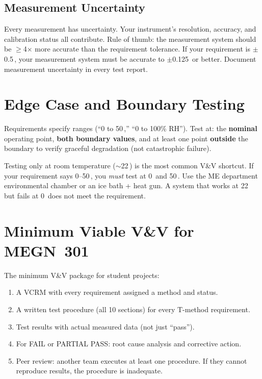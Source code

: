 \subsection{Measurement Uncertainty}
Every measurement has uncertainty. Your instrument's resolution, accuracy, and calibration status all contribute. Rule of thumb: the measurement system should be $\geq$4$\times$ more accurate than the requirement tolerance. If your requirement is $\pm$0.5\,\degC{}, your measurement system must be accurate to $\pm$0.125\,\degC{} or better. Document measurement uncertainty in every test report.

\section{Edge Case and Boundary Testing}
Requirements specify ranges (``0 to 50\,\degC{},'' ``0 to 100\% RH''). Test at: the \textbf{nominal} operating point, \textbf{both boundary values}, and at least one point \textbf{outside} the boundary to verify graceful degradation (not catastrophic failure).

\begin{tipbox}
Testing only at room temperature ($\sim$22\,\degC{}) is the most common V\&V shortcut. If your requirement says 0--50\,\degC{}, you \emph{must} test at 0\,\degC{} and 50\,\degC{}. Use the ME department environmental chamber or an ice bath + heat gun. A system that works at 22\,\degC{} but fails at 0\,\degC{} does not meet the requirement.
\end{tipbox}

\section{Minimum Viable V\&V for MEGN~301}
The minimum V\&V package for student projects:
\begin{enumerate}[nosep,leftmargin=1.5em]
\item A VCRM with every requirement assigned a method and status.
\item A written test procedure (all 10 sections) for every T-method requirement.
\item Test results with actual measured data (not just ``pass'').
\item For FAIL or PARTIAL PASS: root cause analysis and corrective action.
\item Peer review: another team executes at least one procedure. If they cannot reproduce results, the procedure is inadequate.
\end{enumerate}

